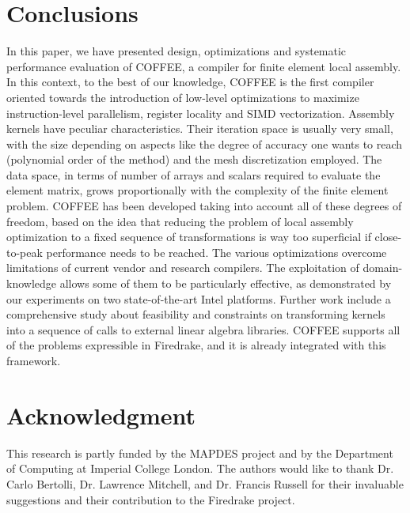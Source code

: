 \documentclass[conference]{IEEEtran}
\begin{document}
\section{Conclusions}
\label{sec:conclusions}

In this paper, we have presented design, optimizations and systematic performance evaluation of COFFEE, a compiler for finite element local assembly. In this context, to the best of our knowledge, COFFEE is the first compiler oriented towards the introduction of low-level optimizations to maximize instruction-level parallelism, register locality and SIMD vectorization. Assembly kernels have peculiar characteristics. Their iteration space is usually very small, with the size depending on aspects like the degree of accuracy one wants to reach (polynomial order of the method) and the mesh discretization employed. The data space, in terms of number of arrays and scalars required to evaluate the element matrix, grows proportionally with the complexity of the finite element problem. COFFEE has been developed taking into account all of these degrees of freedom, based on the idea that reducing the problem of local assembly optimization to a fixed sequence of transformations is way too superficial if close-to-peak performance needs to be reached. The various optimizations overcome limitations of current vendor and research compilers. The exploitation of domain-knowledge allows some of them to be particularly effective, as demonstrated by our experiments on two state-of-the-art Intel platforms. Further work include a comprehensive study about feasibility and constraints on transforming kernels into a sequence of calls to external linear algebra libraries. COFFEE supports all of the problems expressible in Firedrake, and it is already integrated with this framework.



\section*{Acknowledgment}

This research is partly funded by the MAPDES project and by the Department of Computing at Imperial College London. The authors would like to thank Dr. Carlo Bertolli, Dr. Lawrence Mitchell, and Dr. Francis Russell for their invaluable suggestions and their contribution to the Firedrake project.






\end{document}
